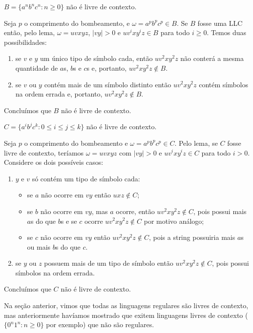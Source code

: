 \begin{example}
  $B = \{a^nb^nc^n : n \geq 0\}$ não é livre de contexto.

  Seja $p$ o comprimento do bombeamento, e $\omega = a^pb^pc^p \in B$.
  Se $B$ fosse uma LLC então, pelo lema, $\omega = uvxyz$, $|vy| > 0$ e $uv^ixy^iz \in B$ para todo $i \geq 0$.
  Temos duas possibilidades:
  \begin{enumerate}
  \item se $v$ e $y$ um único tipo de símbolo cada, então $uv^2xy^2z$ não conterá a mesma quantidade de $a$s, $b$s e $c$s e, portanto, $uv^2xy^2z \notin B$.
  \item se $v$ ou $y$ contém mais de um símbolo distinto então $uv^2xy^2z$ contém símbolos na ordem errada e, portanto, $uv^2xy^2z \notin B$. 
  \end{enumerate}
  Concluímos que $B$ não é livre de contexto.
\end{example}

\begin{example}
  $C = \{a^ib^jc^k : 0 \leq i \leq j \leq k\}$ não é livre de contexto.

  Seja $p$ o comprimento do bombeamento e $\omega = a^pb^pc^p \in C$.
  Pelo lema, se $C$ fosse livre de contexto, teríamos $\omega = uvxyz$ com $|vy| > 0$ e $uv^ixy^iz \in C$ para todo $i > 0$.
  Considere os dois possíveis casos:

  \begin{enumerate}
  \item $y$ e $v$ só contém um tipo de símbolo cada:
    \begin{itemize}
    \item se $a$ não ocorre em $vy$ então $uxz \notin C$;
    \item se $b$ não ocorre em $vy$, mas $a$ ocorre, então $uv^2xy^2z \notin C$, pois possui mais $a$s do que $b$s e se $c$ ocorre $uv^2xy^2z \notin C$ por motivo análogo;
    \item se $c$ não ocorre em $vy$ então $uv^2xy^2z \notin C$, pois a string possuiria mais $a$s ou mais $b$s do que $c$.
    \end{itemize}
  \item se $y$ ou $z$ possuem mais de um tipo de símbolo então $uv^2xy^2z \notin C$, pois possui símbolos na ordem errada.
  \end{enumerate}
  Concluímos que $C$ não é livre de contexto.
\end{example}

Na seção anterior, vimos que todas as linguagens regulares são livres de contexto, mas anteriormente havíamos mostrado que exitem linguagens livres de contexto ($\{0^n1^n: n \geq 0\}$ por exemplo) que não são regulares.


